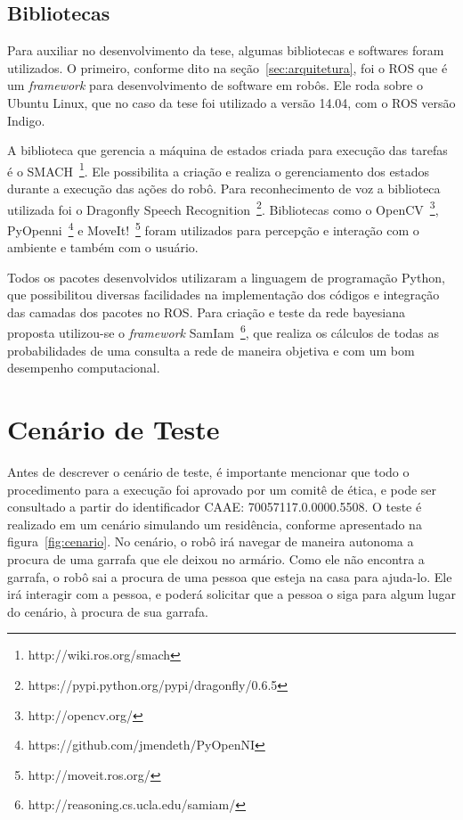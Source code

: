 \subsection{Bibliotecas}
\label{sec:bibliotecas}
Para auxiliar no desenvolvimento da tese, algumas bibliotecas e softwares foram utilizados. O primeiro, conforme dito na seção~\ref{sec:arquitetura}, foi o ROS que é um \emph{framework} para desenvolvimento de software em robôs. Ele roda sobre o Ubuntu Linux, que no caso da tese foi utilizado a versão 14.04, com o ROS versão Indigo.

A biblioteca que gerencia a máquina de estados criada para execução das tarefas é o SMACH~\footnote{http://wiki.ros.org/smach}. Ele possibilita a criação e realiza o gerenciamento dos estados durante a execução das ações do robô. Para reconhecimento de voz a biblioteca utilizada foi o Dragonfly Speech Recognition~\footnote{https://pypi.python.org/pypi/dragonfly/0.6.5}. Bibliotecas como o OpenCV~\footnote{http://opencv.org/}, PyOpenni~\footnote{https://github.com/jmendeth/PyOpenNI} e MoveIt!~\footnote{http://moveit.ros.org/} foram utilizados para percepção e interação com o ambiente e também com o usuário.

Todos os pacotes desenvolvidos utilizaram a linguagem de programação Python, que possibilitou diversas facilidades na implementação dos códigos e integração das camadas dos pacotes no ROS. Para criação e teste da rede bayesiana proposta utilizou-se o \emph{framework} SamIam~\footnote{http://reasoning.cs.ucla.edu/samiam/}, que realiza os cálculos de todas as probabilidades de uma consulta a rede de maneira objetiva e com um bom desempenho computacional.

\section{Cenário de Teste}
\label{sec:cenario}
Antes de descrever o cenário de teste, é importante mencionar que todo o procedimento para a execução foi aprovado por um comitê de ética, e pode ser consultado a partir do identificador CAAE: 70057117.0.0000.5508. O teste é realizado em um cenário simulando um residência, conforme apresentado na figura~\ref{fig:cenario}. No cenário, o robô irá navegar de maneira autonoma a procura de uma garrafa que ele deixou no armário. Como ele não encontra a garrafa, o robô sai a procura de uma pessoa que esteja na casa para ajuda-lo. Ele irá interagir com a pessoa, e poderá solicitar que a pessoa o siga para algum lugar do cenário, à procura de sua garrafa.

